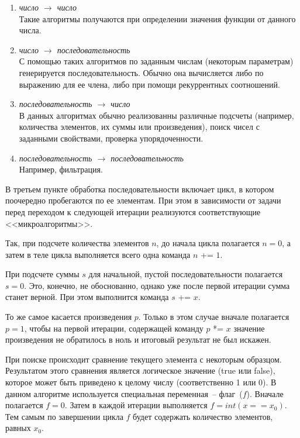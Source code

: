 \documentclass[a4paper, fleqn]{article}
\begin{document}
	\begin{enumerate}
		\item \emph{число $\rightarrow$ число}\\
		Такие алгоритмы получаются при определении значения функции от данного числа.
		\item \emph{число $\rightarrow$ последовательность}\\
		С помощью таких алгоритмов по заданным числам (некоторым параметрам) генерируется последовательность. Обычно она вычисляется либо по выражению для ее члена, либо при помощи рекуррентных соотношений.
		\item \emph{последовательность $\rightarrow$ число}\\
		В данных алгоритмах обычно реализованны различные подсчеты (например, количества элементов, их  суммы или произведения), поиск чисел с заданными свойствами, проверка упорядоченности.
		\item \emph{последовательность $\rightarrow$ последовательность}\\
		Например, фильтрация.
	\end{enumerate}
	
	В третьем пункте обработка последовательности включает цикл, в котором поочередно пробегаются по ее элементам. При этом в зависимости от задачи перед переходом к следующей итерации реализуются соответствующие <<микроалгоритмы>>.
	
	Так, при подсчете количества элементов $n$, до начала  цикла полагается $n=0$, а затем в теле цикла выполняется всего одна команда $n$ += $1$.
	
	При подсчете суммы $s$  для начальной, пустой последовательности полагается $s=0$. Это, конечно, не обоснованно, однако уже после первой итерации сумма станет верной. При этом выполнится команда $s$ += $x$.
	
	То же самое касается произведения $p$. Только в этом случае вначале полагается $p=1$, чтобы на первой итерации, содержащей команду $p$ *= $x$ значение произведения не обратилось в ноль и итоговый результат не был искажен. 
	
	При поиске происходит сравнение текущего элемента с некоторым образцом. Результатом этого сравнения является логическое значение (true или false), которое может быть приведено к целому числу (соответственно 1 или 0). 
	В данном алгоритме используется специальная переменная~-- флаг~($f$). Вначале полагается $f=0$. Затем в каждой итерации выполняется $f=int(x == x_0)$. Тем самым по завершении цикла $f$ будет содержать количество элементов, равных $x_0$. 
	
\end{document}
